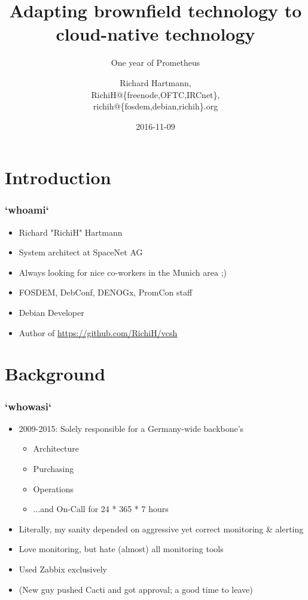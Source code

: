 \documentclass[t]{beamer}
\title{Adapting brownfield technology to cloud-native technology}
\subtitle{One year of Prometheus}
\author{Richard Hartmann,\\
RichiH@\{freenode,OFTC,IRCnet\},\\
richih@\{fosdem,debian,richih\}.org}
\date{2016-11-09}
\begin{document}
\setcounter{tocdepth}{1}

\begin{frame}
	\titlepage
\end{frame}


\section{Introduction}

\begin{frame}
	\frametitle{`whoami`}
	\begin{itemize}
		\item Richard "RichiH" Hartmann
		\item System architect at SpaceNet AG
		\item Always looking for nice co-workers in the Munich area ;)
		\item FOSDEM, DebConf, DENOGx, PromCon staff
		\item Debian Developer
		\item Author of \url{https://github.com/RichiH/vcsh}
	\end{itemize}
\end{frame}

\section{Background}

\begin{frame}
	\frametitle{`whowasi`}
	\begin{itemize}
		\item 2009-2015: Solely responsible for a Germany-wide backbone's
		\begin{itemize}
			\item Architecture
			\item Purchasing
			\item Operations
			\item ...and On-Call for 24 * 365 * 7 hours
		\end{itemize}
		\item Literally, my sanity depended on aggressive yet correct monitoring \& alerting
		\item Love monitoring, but hate (almost) all monitoring tools
		\item Used Zabbix exclusively
		\item (New guy pushed Cacti and got approval; a good time to leave)
	\end{itemize}
\end{frame}
\end{document}
